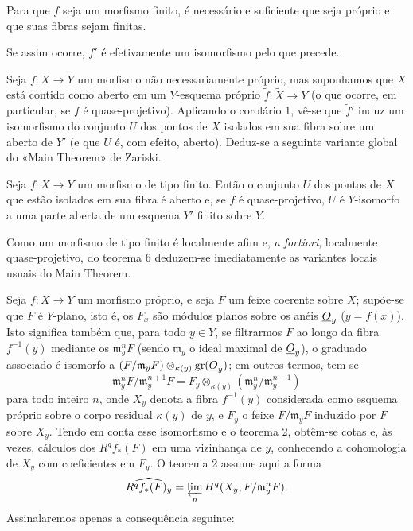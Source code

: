  Para que $f$ seja um morfismo finito, é necessário e
suficiente que seja próprio e que suas fibras sejam finitas.

Se assim ocorre, $f'$ é efetivamente um isomorfismo pelo que precede.

Seja $f:X\longrightarrow Y$ um morfismo não necessariamente próprio, mas
suponhamos que $X$ está contido como aberto em um $Y$-esquema próprio
$\widetilde f:\widetilde X\longrightarrow Y$ (o que ocorre, em particular,
se $f$ é quase-projetivo). Aplicando o corolário 1, vê-se que $\widetilde f'$
induz um isomorfismo do conjunto $U$ dos pontos de $X$ isolados em sua fibra
sobre um aberto de $Y'$ (e que $U$ é, com efeito, aberto). Deduz-se a
seguinte variante global do «Main Theorem» de Zariski.

 Seja
$f:X\longrightarrow Y$ um morfismo de tipo finito. Então o conjunto $U$ dos
pontos de $X$ que estão isolados em sua fibra é aberto e, se $f$ é
quase-projetivo, $U$ é
$Y$-isomorfo a uma parte aberta de um esquema $Y'$ finito sobre $Y$.

Como um morfismo de tipo finito é localmente afim e, \textit{a fortiori},
localmente quase-projetivo, do teorema 6 deduzem-se imediatamente as variantes
locais usuais do Main Theorem.


Seja $f:X\longrightarrow Y$ um morfismo próprio, e seja $F$ um feixe coerente sobre
$X$; supõe-se que $F$ é $Y$-plano, isto é, os $F_x$ são módulos planos sobre os
anéis $\underline{O}_y$ ($y=f(x)$). Isto significa também que, para todo $y\in Y$, se
filtrarmos $F$ ao longo da fibra $f^{-1}(y)$ mediante os
$\mathfrak m_y^nF$ (sendo $\mathfrak m_y$ o ideal maximal de $\underline{O}_y$), o
graduado associado é isomorfo a
$(F/\mathfrak m_yF)\otimes_{\kappa(y)}\operatorname{gr}(\underline{O}_y)$; em outros
termos, tem-se
\[
  \mathfrak m_y^nF/\mathfrak m_y^{n+1}F
  =F_y\otimes_{\kappa(y)}
  (\mathfrak m_y^n/\mathfrak m_y^{n+1})
\]
para todo inteiro $n$, onde $X_y$ denota a fibra $f^{-1}(y)$ considerada como
esquema próprio sobre o corpo residual $\kappa(y)$ de $y$, e $F_y$ o feixe
$F/\mathfrak m_yF$ induzido por $F$ sobre $X_y$. Tendo em conta esse
isomorfismo e o teorema 2, obtêm-se cotas e, às vezes, cálculos dos
$R^qf_*(F)$ em uma vizinhança de $y$, conhecendo a cohomologia de $X_y$ com
coeficientes em $F_y$. O teorema 2 assume aqui a forma
\[
  \widehat{R^qf_*(F)_y}
  =\varprojlim_n H^q(X_y,F/\mathfrak m_y^nF).
\]
Assinalaremos apenas a consequência seguinte:

